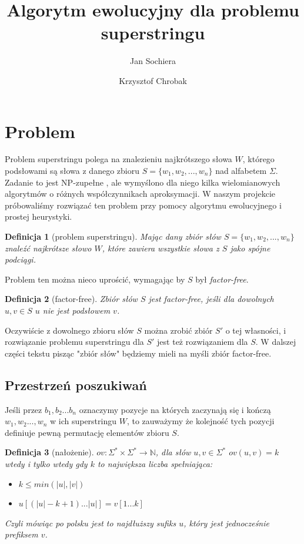 \documentclass[11pt, a4wide]{mwart}
\title{Algorytm ewolucyjny dla problemu superstringu}
\author{Jan Sochiera \and Krzysztof Chrobak}
\newtheorem{definition}{Definicja}
\begin{document}
\maketitle
\tableofcontents



\section{Problem}
Problem superstringu polega na znalezieniu najkrótszego słowa $W$, którego
podsłowami są słowa z danego zbioru $S = \{w_1, w_2, ..., w_n\}$ nad alfabetem
$\Sigma$. Zadanie to jest NP-zupełne \cite{GJ}, ale wymyślono dla niego kilka
wielomianowych algorytmów o różnych współczynnikach aproksymacji. W naszym
projekcie próbowaliśmy rozwiązać ten problem przy pomocy algorytmu ewolucyjnego
i prostej heurystyki.

\begin{definition}[problem superstringu] 
Mając dany zbiór słów $S = \{w_1, w_2, ..., w_n\}$ znaleźć najkrótsze słowo
$W$, które zawiera wszystkie słowa z $S$ jako spójne podciągi.  
\end{definition}

Problem ten można nieco uprościć, wymagając by $S$ był \emph{factor-free}.

\begin{definition}[factor-free] 
Zbiór słów $S$ jest factor-free, jeśli dla dowolnych $u, v \in S$ $u$ nie jest
podsłowem $v$.  
\end{definition}

Oczywiście z dowolnego zbioru słów $S$ można zrobić zbiór $S'$ o tej własności,
i rozwiązanie problemu superstringu dla $S'$ jest też rozwiązaniem dla $S$. W
dalszej części tekstu pisząc "zbiór słów" będziemy mieli na myśli zbiór
factor-free.


\subsection{Przestrzeń poszukiwań}
Jeśli przez $b_1, b_2 ... b_n$ oznaczymy pozycje na których zaczynają się i
kończą $w_1, w_2 ..., w_n$ w ich superstringu $W$, to zauważymy że kolejność
tych pozycji definiuje pewną permutację elementów zbioru $S$.

\begin{definition}[nałożenie] 
$ov : \Sigma^* \times \Sigma^* \rightarrow \mathbb{N}$, dla słów $u, v \in \Sigma^*$ 
$ov(u, v) = k$ wtedy i tylko wtedy gdy $k$ to największa liczba spełniająca:
\begin{itemize}
  \item $k \leq min(|u|, |v|)$
  \item $u[(|u| - k + 1) ... |u|] = v[1...k]$
\end{itemize}
Czyli mówiąc po polsku jest to najdłuższy sufiks $u$, który jest jednocześnie prefiksem
$v$.
\end{definition}
\end{document}
